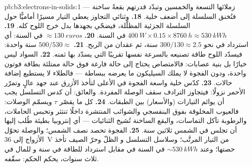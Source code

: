 \begin{solution}{pb:b3:electrons-in-solids:1}
زملائها التسعة والخمسين وتبدّد قدرتهم بقعةً ساخنة
--- فتُخنق السلسلة إلى أضعف خلية.
\textbf{18.} وثنائي التجاوز يعطي التيار مسيرًا أماميًّا
حول السلسلة الجزئية المظلَّلة، فيضحّي بجهدها بدل
خرج اللوح كله.
\textbf{19.} $\qty{400}{W}\times0.15\times\qty{8760}{h} \approx
\qty{530}{kWh}$ في السنة.
\textbf{20.} $\approx\qty{130}{euros}$ في السنة: أي استرداد في
نحو $300/130 \approx 2.5$ سنة، ثم عقدان من الربح.
\textbf{21.} $500/530 \approx$ سنة واحدة: فيسدّد اللوح طاقة
تصنيعه بالسرعة نفسها تقريبًا التي يسدّد بها ثمنه.
\textbf{22.} السواد ليس خيارًا بل بنية عصابات:
فالامتصاص يحتاج إلى حالة فارغة فوق حالة ممتلئة بطاقة فوتون
واحدة، ودون الفجوة لا يملك السيليكون ما يعرضه ببساطة ---
فالطلاء لا يستطيع إضافة حالات.
\textbf{23.} كدّس خلية واسعة الفجوة في الأعلى لتأخذ الأزرق عند
جهد عالٍ وتمرّر الأحمر نزولًا: فيتجاوز الترادف
سقف الوصلة المفردة. والعائق: أن كدس التسلسل يجب أن يوائم
التيارات (والأسعار) بين الطبقات.
\textbf{24.} كل ما يقصّر $\tau$ ويسمّم الوصلات: فالعيوب
المخلوقة بفوق البنفسجي والشوائب المنتشرة داخلًا تنتثر وتحبس
الحاملات، والرطوبة تآكل التماسات، والبقع الساخنة تُشيخ
الثنائيات --- أي إنتروبيا بطيئة  طُلب إليها أن تجلس في الشمس
ثلاثين سنة.
\textbf{25.} الفجوة تحصد نصف الشمس؛ والوصلة تحوّل
الأزواج إلى \qty{36}{V} من التيار المرتَّب؛ وسلاسل التسلسل و
الظلّ وحرّ الصيف تأخذ حصتها؛ وعند
$\sim\qty{530}{kWh}$ في السنة في مقابل استرداد للطاقة في سنة و
للمال في ثلاث سنوات، يحكم الحكم: سقّفه.
\end{solution}
